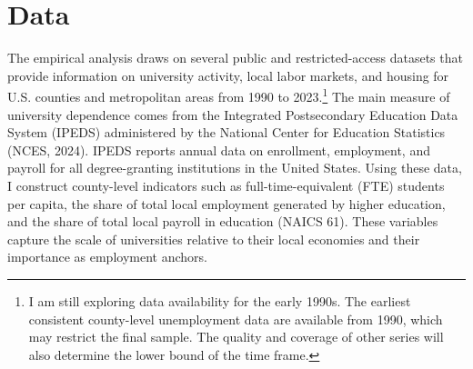 
\section{ Data}

\noindent The empirical analysis draws on several public and restricted-access datasets that provide information on university activity, local labor markets, and housing for U.S. counties and metropolitan areas from 1990 to 2023.\footnote{I am still exploring data availability for the early 1990s. The earliest consistent county-level unemployment data are available from 1990, which may restrict the final sample. The quality and coverage of other series will also determine the lower bound of the time frame.} The main measure of university dependence comes from the Integrated Postsecondary Education Data System (IPEDS) administered by the National Center for Education Statistics (NCES, 2024). IPEDS reports annual data on enrollment, employment, and payroll for all degree-granting institutions in the United States. Using these data, I construct county-level indicators such as full-time-equivalent (FTE) students per capita, the share of total local employment generated by higher education, and the share of total local payroll in education (NAICS 61). These variables capture the scale of universities relative to their local economies and their importance as employment anchors.

